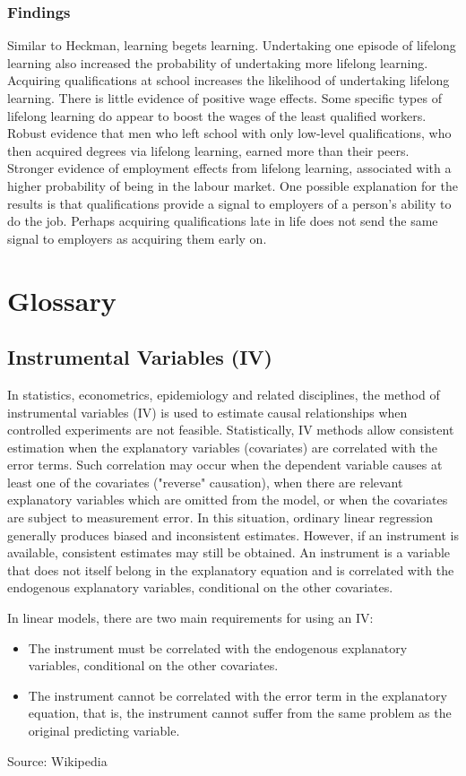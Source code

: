 \documentclass[12pt,a4paper]{article}
\begin{document}
      \subsubsection{Findings}
      Similar to Heckman, learning begets learning. Undertaking one episode of lifelong learning also increased the probability of undertaking more lifelong learning. Acquiring qualifications at school increases the likelihood of undertaking lifelong learning. There is little evidence of positive wage effects. Some specific types of lifelong learning do appear to boost the wages of the least qualified workers. Robust evidence that men who left school with only low-level qualifications, who then acquired degrees via lifelong learning, earned more than their peers. Stronger evidence of employment effects from lifelong learning, associated with a higher probability of being in the labour market. One possible explanation for the results is that qualifications provide a signal to employers of a person’s ability to do the job. Perhaps acquiring qualifications late in life does not send the same signal to employers as acquiring them early on.


  \appendix
\section{Glossary} %
  \label{sec:Glossary}
  \subsection{Instrumental Variables (IV)} %
  \label{sub:IV}
  In statistics, econometrics, epidemiology and related disciplines,
  the method of instrumental variables (IV) is used to estimate
  causal relationships when controlled experiments are not feasible.
  Statistically, IV methods allow consistent estimation when the
  explanatory variables (covariates) are correlated with the error terms.
  Such correlation may occur when the dependent variable causes at least
  one of the covariates ("reverse" causation), when there are relevant
  explanatory variables which are omitted from the model, or when the
  covariates are subject to measurement error. In this situation, ordinary
  linear regression generally produces biased and inconsistent estimates.
  However, if an instrument is available, consistent estimates may still
  be obtained. An instrument is a variable that does not itself belong
  in the explanatory equation and is correlated with the endogenous
  explanatory variables, conditional on the other covariates. 

  In linear models, there are two main requirements for using an IV:
  \begin{itemize}
    \item The instrument must be correlated with the endogenous explanatory variables, conditional on the other covariates.
    \item The instrument cannot be correlated with the error term in the explanatory equation, that is, the instrument cannot suffer from the same problem as the original predicting variable.
  \end{itemize}
  \footnotesize{Source: Wikipedia}
  
\end{document}
